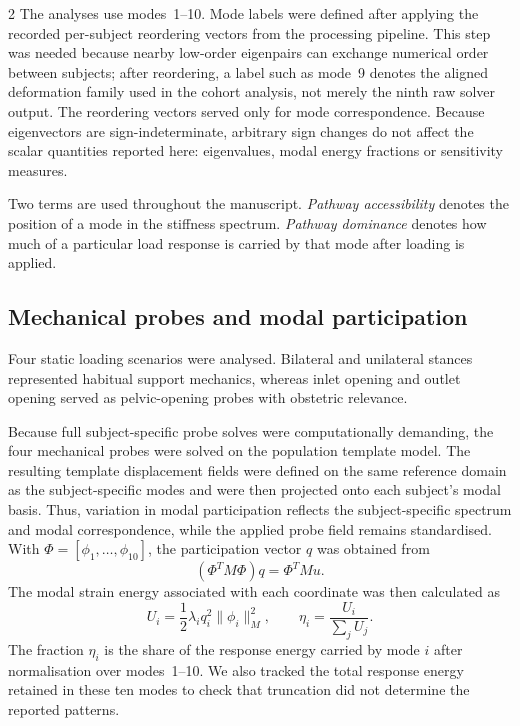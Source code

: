 \documentclass[openacc]{rsproca_new}
\begin{document}
\begin{multicols}{2}
The analyses use modes~1--10. Mode labels were defined after applying the recorded per-subject reordering vectors from the processing pipeline. This step was needed because nearby low-order eigenpairs can exchange numerical order between subjects; after reordering, a label such as mode~9 denotes the aligned deformation family used in the cohort analysis, not merely the ninth raw solver output. The reordering vectors served only for mode correspondence. Because eigenvectors are sign-indeterminate, arbitrary sign changes do not affect the scalar quantities reported here: eigenvalues, modal energy fractions or sensitivity measures.

Two terms are used throughout the manuscript. \emph{Pathway accessibility} denotes the position of a mode in the stiffness spectrum. \emph{Pathway dominance} denotes how much of a particular load response is carried by that mode after loading is applied.


\subsection{Mechanical probes and modal participation}

Four static loading scenarios were analysed. Bilateral and unilateral stances represented habitual support mechanics, whereas inlet opening and outlet opening served as pelvic-opening probes with obstetric relevance.

Because full subject-specific probe solves were computationally demanding, the four mechanical probes were solved on the population template model. The resulting template displacement fields were defined on the same reference domain as the subject-specific modes and were then projected onto each subject's modal basis. Thus, variation in modal participation reflects the subject-specific spectrum and modal correspondence, while the applied probe field remains standardised. With $\Phi=[\phi_{1},\ldots,\phi_{10}]$, the participation vector $q$ was obtained from
\begin{equation}
(\Phi^{T}M\Phi)q = \Phi^{T}Mu.
\end{equation}
The modal strain energy associated with each coordinate was then calculated as
\begin{equation}
U_{i}=\frac{1}{2}\lambda_{i}q_{i}^{2}\lVert\phi_{i}\rVert_{M}^{2}, \qquad
\eta_{i}=\frac{U_{i}}{\sum_{j}U_{j}}.
\end{equation}
The fraction $\eta_i$ is the share of the response energy carried by mode $i$ after normalisation over modes~1--10. We also tracked the total response energy retained in these ten modes to check that truncation did not determine the reported patterns.


\end{multicols}
\end{document}
